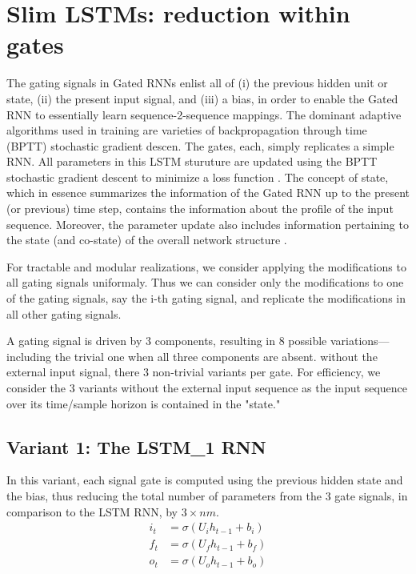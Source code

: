 \documentclass{article}
\begin{document}
\section{Slim LSTMs: reduction within gates}

The gating signals in Gated RNNs enlist all of (i) the previous hidden unit or state, (ii) the present input signal, and (iii) a bias, in order to enable the Gated RNN to essentially learn sequence-2-sequence mappings. The dominant adaptive algorithms used in training are varieties of backpropagation through time (BPTT)  stochastic gradient descen.  The gates, each, simply replicates a simple RNN. All parameters in this LSTM sturuture are updated using the BPTT stochastic gradient descent to minimize a loss function \cite{gers2002learning, Odyssey2016}. The concept of state, which in essence summarizes the information of the Gated RNN up to the present (or previous) time step, contains the information about the profile of the input sequence. Moreover, the parameter update also includes information pertaining to the state (and co-state) of the overall network structure  \cite{salem2016reduced,salem2016basic}.

For tractable and modular realizations, we consider applying the modifications to all gating signals uniformaly. Thus we can consider only the modifications to one of the gating signals, say the i-th gating signal, and replicate the modifications in all other gating signals.

A gating signal is driven by 3 components, resulting in 8 possible variations--- including the trivial one when all three components are absent. without the external input signal, there 3  non-trivial variants per gate. For efficiency, we consider the 3 variants without the external input sequence as the input sequence over its time/sample horizon is contained in the "state."
\\
\subsection{Variant 1: The LSTM\_1 RNN}
In this variant, each signal gate is computed using the previous hidden state and the bias, thus reducing the total number of parameters from the 3 gate signals, in comparison to the LSTM RNN, by $3 \times nm$.
\begin{align}
	i_t &= \sigma(U_i h_{t-1} + b_i)\\
	f_t &= \sigma(U_f h_{t-1} + b_f)\\
	o_t &= \sigma(U_o h_{t-1} + b_o)
\end{align}
\end{document}
